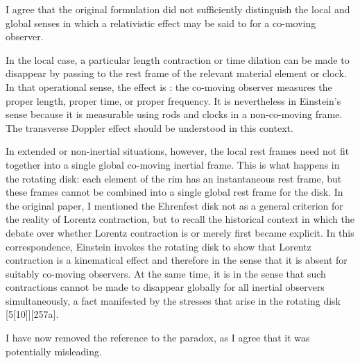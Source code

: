 \documentclass[submitted,11pt]{article}
\newcommand{\tDe}{transverse Doppler effect\xspace}
\begin{document}
\begin{reply}
I agree that the original formulation did not sufficiently distinguish the local and global senses in which a relativistic effect may be said to  for a co-moving observer.

In the local case, a particular length contraction or time dilation can be made to disappear by passing to the rest frame of the relevant material element or clock. In that operational sense, the effect is : the co-moving observer measures the proper length, proper time, or proper frequency. It is nevertheless  in Einstein's sense because it is measurable using rods and clocks in a non-co-moving frame. The \tDe should be understood in this context.

In extended or non-inertial situations, however, the local rest frames need not fit together into a single global co-moving inertial frame. This is what happens in the rotating disk: each element of the rim has an instantaneous rest frame, but these frames cannot be combined into a single global rest frame for the disk. In the original paper, I mentioned the Ehrenfest disk not as a general criterion for the reality of Lorentz contraction, but to recall the historical context in which the debate over whether Lorentz contraction is  or merely  first became explicit. In this correspondence, Einstein invokes the rotating disk to show that Lorentz contraction is a kinematical effect and therefore  in the sense that it is absent for suitably co-moving observers. At the same time, it is  in the sense that such contractions cannot be made to disappear globally for all inertial observers simultaneously, a fact manifested by the stresses that arise in the rotating disk [5{[}10{]}][257a].

I have now removed the reference to the \Ehr paradox, as I agree that it was potentially misleading.





\end{reply}
\end{document}
